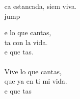 \begin{cancion}
	ca estancada, siem viva. \\jump\\
	\begin{chorus}%
	e lo que cantas, \\
	ta con la vida.\\
	e que tas.\\
	\jump\\
Vive lo que cantas,\\
	que ya en ti mi vida.\\
	e que tas    \\
	\end{chorus}%
	\jump\\
\end{cancion}%
